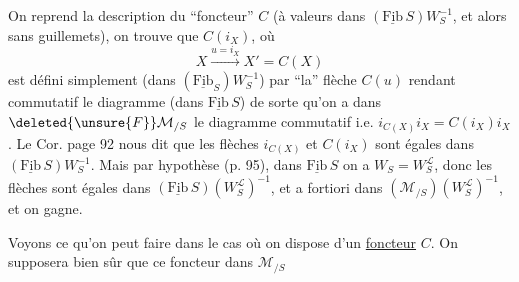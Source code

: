 On reprend la description du ``foncteur'' $C$ (à valeurs dans $(\underline{\mathrm{Fib}}\,S)W_S^{-1}$, et alors sans guillemets), on trouve que $C(i_X)$, où
\[
X\xrightarrow{u=i_X}X'=C(X)
\]
est défini simplement (dans $(\underline{\mathrm{Fib}}_S)W_S^{-1}$) par ``la'' flèche $C(u)$ rendant commutatif le diagramme (dans $\underline{\mathrm{Fib}}\,S$)
de sorte qu'on a dans $\deleted{\unsure{F}}\mathcal M_{/S}$ le diagramme
commutatif i.e. $i_{C(X)}i_X=C(i_X)i_X$. Le Cor. page 92 nous dit que les flèches $i_{C(X)}$ et $C(i_X)$ sont égales dans $(\underline{\mathrm{Fib}}\,S)W_S^{-1}$.
Mais par hypothèse (p. 95), dans $\underline{\mathrm{Fib}}\,S$ on a $W_S=W_S^{\mathcal L}$, donc les flèches sont égales dans $(\underline{\mathrm{Fib}}\,S)(W_S^{\mathcal L})^{-1}$, et a fortiori dans $(\mathcal M_{/S})(W_S^{\mathcal L})^{-1}$, et on gagne.

Voyons ce qu'on peut faire dans le cas où on dispose d'un \uline{foncteur} $C$. On supposera bien sûr que ce foncteur dans $\mathcal M_{/S}$
